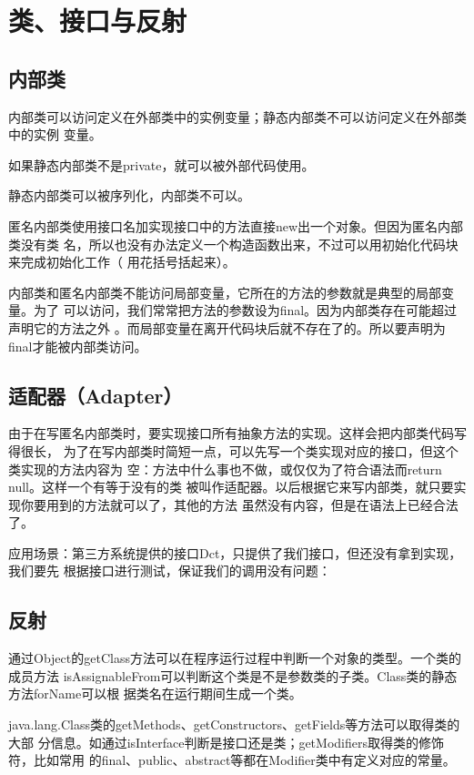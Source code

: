 \chapter{类、接口与反射}


\section{内部类}

内部类可以访问定义在外部类中的实例变量；静态内部类不可以访问定义在外部类中的实例
变量。

如果静态内部类不是private，就可以被外部代码使用。

静态内部类可以被序列化，内部类不可以。

匿名内部类使用接口名加实现接口中的方法直接new出一个对象。但因为匿名内部类没有类
名，所以也没有办法定义一个构造函数出来，不过可以用初始化代码块来完成初始化工作（
用花括号括起来）。

内部类和匿名内部类不能访问局部变量，它所在的方法的参数就是典型的局部变量。为了
可以访问，我们常常把方法的参数设为final。因为内部类存在可能超过声明它的方法之外
。而局部变量在离开代码块后就不存在了的。所以要声明为final才能被内部类访问。


\section{适配器（Adapter）}

由于在写匿名内部类时，要实现接口所有抽象方法的实现。这样会把内部类代码写得很长，
为了在写内部类时简短一点，可以先写一个类实现对应的接口，但这个类实现的方法内容为
空：方法中什么事也不做，或仅仅为了符合语法而return null。这样一个有等于没有的类
被叫作适配器。以后根据它来写内部类，就只要实现你要用到的方法就可以了，其他的方法
虽然没有内容，但是在语法上已经合法了。

应用场景：第三方系统提供的接口Dct，只提供了我们接口，但还没有拿到实现，我们要先
根据接口进行测试，保证我们的调用没有问题：







\section{反射}

通过Object的getClass方法可以在程序运行过程中判断一个对象的类型。一个类的成员方法
isAssignableFrom可以判断这个类是不是参数类的子类。Class类的静态方法forName可以根
据类名在运行期间生成一个类。

java.lang.Class类的getMethods、getConstructors、getFields等方法可以取得类的大部
分信息。如通过isInterface判断是接口还是类；getModifiers取得类的修饰符，比如常用
的final、public、abstract等都在Modifier类中有定义对应的常量。




